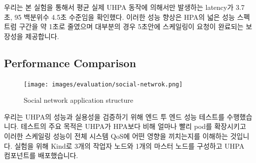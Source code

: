 \documentclass[conference]{IEEEtran}
\begin{document}
우리는 본 실험을 통해서 평균 실제 UHPA 동작에 의해서만 발생하는 latency가 3.7초, 95 백분위수 4.5초 수준임을 확인했다. 이러한 성능 향상은 HPA의 넓은 성능 스펙트럼 구간을 약 1초로 줄였으며 대부분의 경우 5초안에 스케일링이 요청이 완료되는 보장성을 제공합니다.




\subsection{Performance Comparison}

\begin{figure}[tb]
    \centering
    {\texttt{[image: images/evaluation/social-netwrok.png]}}
    \caption{Social network application structure}
    \label{fig:social network}
\end{figure}


우리는 UHPA의 성능과 실용성을 검증하기 위해 엔드 투 엔드 성능 테스트를 수행했습니다. 테스트의 주요 목적은 UHPA가 HPA보다 비해 얼마나 빨리 pod를 확장시키고 이러한 스케일링 성능이 전체 시스템 QoS에 어떤 영향을 끼치는지를 이해하는 것입니다. 실험을 위해 Kind로 3개의 작업자 노드와 1개의 마스터 노드를 구성하고 UHPA 컴포넌트를 배포했습니다.
\end{document}
